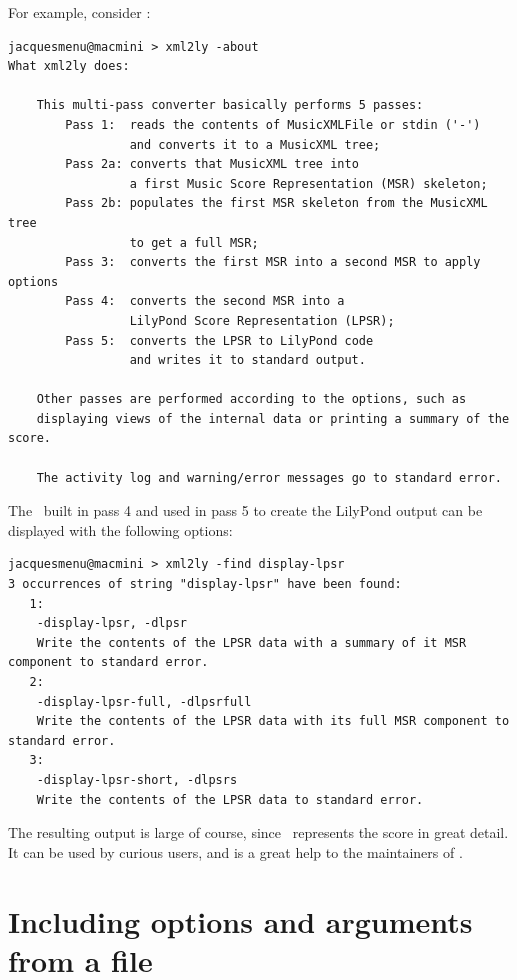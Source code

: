 For example, consider \xmlToLy:
\begin{lstlisting}[language=Terminal]
jacquesmenu@macmini > xml2ly -about
What xml2ly does:

    This multi-pass converter basically performs 5 passes:
        Pass 1:  reads the contents of MusicXMLFile or stdin ('-')
                 and converts it to a MusicXML tree;
        Pass 2a: converts that MusicXML tree into
                 a first Music Score Representation (MSR) skeleton;
        Pass 2b: populates the first MSR skeleton from the MusicXML tree
                 to get a full MSR;
        Pass 3:  converts the first MSR into a second MSR to apply options
        Pass 4:  converts the second MSR into a
                 LilyPond Score Representation (LPSR);
        Pass 5:  converts the LPSR to LilyPond code
                 and writes it to standard output.

    Other passes are performed according to the options, such as
    displaying views of the internal data or printing a summary of the score.

    The activity log and warning/error messages go to standard error.
\end{lstlisting}

The \lpsrRepr\ built in pass 4 and used in pass 5 to create the LilyPond output can be displayed with the following options:
\begin{lstlisting}[language=Terminal]
jacquesmenu@macmini > xml2ly -find display-lpsr
3 occurrences of string "display-lpsr" have been found:
   1:
    -display-lpsr, -dlpsr
    Write the contents of the LPSR data with a summary of it MSR component to standard error.
   2:
    -display-lpsr-full, -dlpsrfull
    Write the contents of the LPSR data with its full MSR component to standard error.
   3:
    -display-lpsr-short, -dlpsrs
    Write the contents of the LPSR data to standard error.
\end{lstlisting}

The resulting output is large of course, since \lpsrRepr\ represents the score in great detail.
It can be used by curious users, and is a great help to the maintainers of \mf.


\chapter{Including options and arguments from a file}\label{Including options and arguments from a file}

